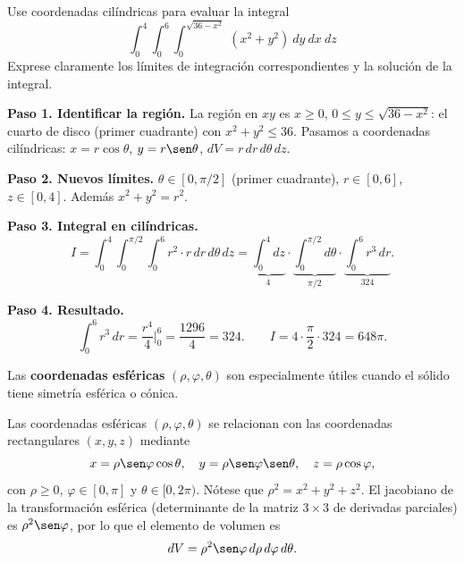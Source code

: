 \begin{prob}
Use coordenadas cilíndricas para evaluar la integral
\[ \displaystyle\int_{0}^{4}\int_{0}^{6}\int_{0}^{\sqrt{36-x^2}}\ \left(x^2+y^2\right)\ dy\ dx\ dz\]
Exprese claramente los límites de integración correspondientes y la solución de la integral.
\begin{myproof}
\textbf{Paso 1. Identificar la región.} La región en $xy$ es $x\ge0$, $0\le y\le\sqrt{36-x^2}$: el cuarto de disco (primer cuadrante) con $x^2+y^2\le36$. Pasamos a coordenadas cilíndricas: $x=r\cos\theta$, $y=r\sen\theta$, $dV=r\,dr\,d\theta\,dz$.

\textbf{Paso 2. Nuevos límites.} $\theta\in[0,\pi/2]$ (primer cuadrante), $r\in[0,6]$, $z\in[0,4]$. Además $x^2+y^2=r^2$.

\textbf{Paso 3. Integral en cilíndricas.}
\[
I = \int_0^4\!\int_0^{\pi/2}\!\int_0^6 r^2\cdot r\,dr\,d\theta\,dz
= \underbrace{\int_0^4 dz}_{4}\cdot
  \underbrace{\int_0^{\pi/2}d\theta}_{\pi/2}\cdot
  \underbrace{\int_0^6 r^3\,dr}_{324}.
\]

\textbf{Paso 4. Resultado.}
\[
\int_0^6 r^3\,dr = \frac{r^4}{4}\Big|_0^6 = \frac{1296}{4}=324.
\qquad
I = 4\cdot\frac{\pi}{2}\cdot 324 = \boxed{648\pi}.
\]
\end{myproof}
\end{prob}

Las \textbf{coordenadas esféricas} $(\rho,\varphi,\theta)$ son especialmente útiles cuando el sólido tiene simetría esférica o cónica.

\begin{definition}
Las coordenadas esféricas $(\rho,\varphi,\theta)$ se relacionan con las coordenadas rectangulares $(x,y,z)$ mediante
\[
x = \rho\sen\varphi\cos\theta,\quad
y = \rho\sen\varphi\sen\theta,\quad
z = \rho\cos\varphi,
\]
con $\rho\ge0$, $\varphi\in[0,\pi]$ y $\theta\in[0,2\pi)$. Nótese que
$\rho^2 = x^2+y^2+z^2$. El jacobiano de la transformación esférica
(determinante de la matriz $3\times3$ de derivadas parciales) es
$\rho^2\sen\varphi$, por lo que el elemento de volumen es
\[
dV = \rho^2\sen\varphi\,d\rho\,d\varphi\,d\theta.
\]
\end{definition}

